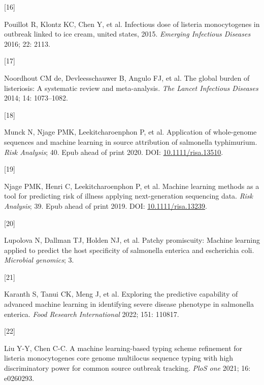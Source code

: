 \documentclass[
  10pt,
]{article}
\newlength{\cslhangindent}
\newlength{\csllabelwidth}
\newlength{\cslentryspacingunit} %
\newenvironment{CSLReferences}[2] %
 {%
  \setlength{\parindent}{0pt}
  \ifodd #1
  \let\oldpar\par
  \def\par{\hangindent=\cslhangindent\oldpar}
  \fi
  \setlength{\parskip}{#2\cslentryspacingunit}
 }%
 {}
\newcommand{\CSLLeftMargin}[1]{\parbox[t]{\csllabelwidth}{#1}}
\newcommand{\CSLRightInline}[1]{\parbox[t]{\linewidth - \csllabelwidth}{#1}\break}
\begin{document}
\begin{CSLReferences}{0}{0}
\leavevmode{}%
\CSLLeftMargin{{[}16{]} }%
\CSLRightInline{Pouillot R, Klontz KC, Chen Y, et al. Infectious dose of listeria monocytogenes in outbreak linked to ice cream, united states, 2015. \emph{Emerging Infectious Diseases} 2016; 22: 2113.}

\leavevmode{}%
\CSLLeftMargin{{[}17{]} }%
\CSLRightInline{Noordhout CM de, Devleesschauwer B, Angulo FJ, et al. The global burden of listeriosis: A systematic review and meta-analysis. \emph{The Lancet Infectious Diseases} 2014; 14: 1073--1082.}

\leavevmode{}%
\CSLLeftMargin{{[}18{]} }%
\CSLRightInline{Munck N, Njage PMK, Leekitcharoenphon P, et al. Application of whole-genome sequences and machine learning in source attribution of salmonella typhimurium. \emph{Risk Analysis}; 40. Epub ahead of print 2020. DOI: \href{https://doi.org/10.1111/risa.13510}{10.1111/risa.13510}.}

\leavevmode{}%
\CSLLeftMargin{{[}19{]} }%
\CSLRightInline{Njage PMK, Henri C, Leekitcharoenphon P, et al. Machine learning methods as a tool for predicting risk of illness applying next-generation sequencing data. \emph{Risk Analysis}; 39. Epub ahead of print 2019. DOI: \href{https://doi.org/10.1111/risa.13239}{10.1111/risa.13239}.}

\leavevmode{}%
\CSLLeftMargin{{[}20{]} }%
\CSLRightInline{Lupolova N, Dallman TJ, Holden NJ, et al. Patchy promiscuity: Machine learning applied to predict the host specificity of salmonella enterica and escherichia coli. \emph{Microbial genomics}; 3.}

\leavevmode{}%
\CSLLeftMargin{{[}21{]} }%
\CSLRightInline{Karanth S, Tanui CK, Meng J, et al. Exploring the predictive capability of advanced machine learning in identifying severe disease phenotype in salmonella enterica. \emph{Food Research International} 2022; 151: 110817.}

\leavevmode{}%
\CSLLeftMargin{{[}22{]} }%
\CSLRightInline{Liu Y-Y, Chen C-C. A machine learning-based typing scheme refinement for listeria monocytogenes core genome multilocus sequence typing with high discriminatory power for common source outbreak tracking. \emph{PloS one} 2021; 16: e0260293.}


\end{CSLReferences}
\end{document}
